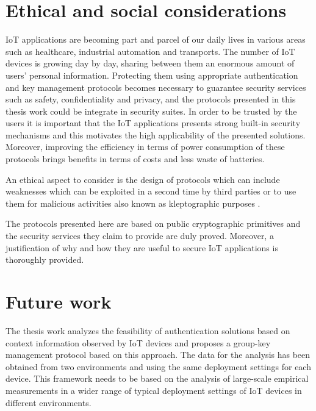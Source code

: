 \section{Ethical and social considerations}

IoT  applications  are  becoming  part  and  parcel  of  our  daily  lives  in  various  areas such as healthcare, industrial automation and transports. 
The number of IoT devices is growing day by day, sharing between them an enormous amount of users' personal information.
Protecting them using appropriate authentication and key management protocols becomes necessary to guarantee security services such as safety, confidentiality and privacy, and the protocols presented in this thesis work could be integrate in security suites.
In order to be trusted by the users it is important that the IoT applications presents strong built-in security mechanisms and this motivates the high applicability of the presented solutions.
Moreover, improving the efficiency in terms of power consumption of these protocols brings benefits in terms of costs and less waste of batteries.

An ethical aspect to consider is the design of protocols which can include weaknesses which can be exploited in a second time by third parties \cite{DorothyE.DenningandMilesSmid1994KeyMagazine} or to use them for malicious activities also known as kleptographic purposes \cite{Young2010MaliciousAspects}.

The protocols presented here are based on public cryptographic primitives and the security services they claim to provide are duly proved. 
Moreover, a justification of why and how they are useful to secure IoT applications is thoroughly
provided. 








\section{Future work}
The thesis work analyzes the feasibility of authentication solutions based on context information observed by IoT devices and proposes a group-key management protocol based on this approach. 
The data for the analysis has been obtained from two environments and using the same deployment settings for each device.
This framework needs to be based on the  analysis  of  large-scale empirical measurements in a wider range of typical deployment settings of IoT devices  in  different environments. 

